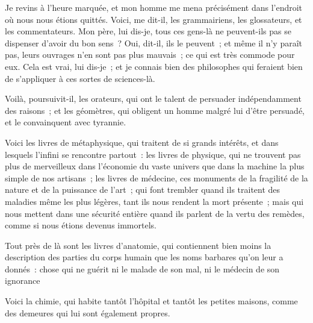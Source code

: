 \documentclass[french,twoside]{book} %
\begin{document}
\noindent Je revins à l’heure marquée, et mon homme me mena précisément dans l’endroit où nous nous étions quittés. Voici, me dit-il, les grammairiens, les glossateurs, et les commentateurs. Mon père, lui dis-je, tous ces gens-là ne peuvent-ils pas se dispenser d’avoir du bon sens ? Oui, dit-il, ils le peuvent ; et même il n’y paraît pas, leurs ouvrages n’en sont pas plus mauvais ; ce qui est très commode pour eux. Cela est vrai, lui dis-je ; et je connais bien des philosophes qui feraient bien de s’appliquer à ces sortes de sciences-là.\par
Voilà, poursuivit-il, les orateurs, qui ont le talent de persuader indépendamment des raisons ; et les géomètres, qui obligent un homme malgré lui d’être persuadé, et le convainquent avec tyrannie.\par
Voici les livres de métaphysique, qui traitent de si grands intérêts, et dans lesquels l’infini se rencontre partout : les livres de physique, qui ne trouvent pas plus de merveilleux dans l’économie du vaste univers que dans la machine la plus simple de nos artisans ; les livres de médecine, ces monuments de la fragilité de la nature et de la puissance de l’art ; qui font trembler quand ils traitent des maladies même les plus légères, tant ils nous rendent la mort présente ; mais qui nous mettent dans une sécurité entière quand ils parlent de la vertu des remèdes, comme si nous étions devenus immortels.\par
Tout près de là sont les livres d’anatomie, qui contiennent bien moins la description des parties du corps humain que les noms barbares qu’on leur a donnés : chose qui ne guérit ni le malade de son mal, ni le médecin de son ignorance\par
Voici la chimie, qui habite tantôt l’hôpital et tantôt les petites maisons, comme des demeures qui lui sont également propres.\par
\end{document}
